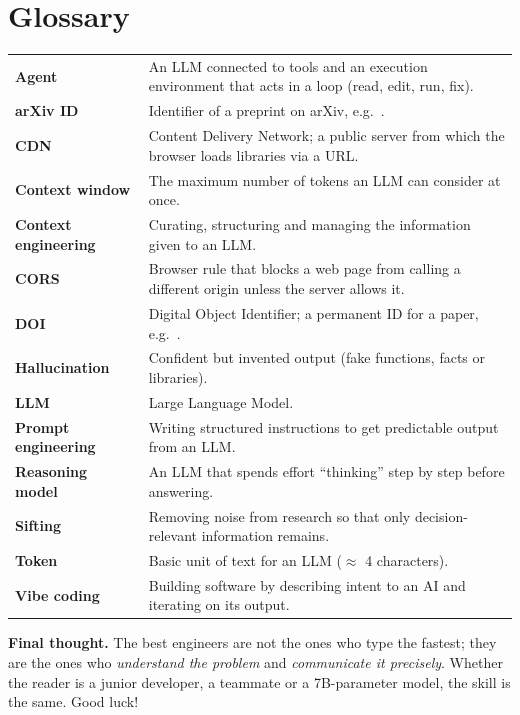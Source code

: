 \documentclass[11pt,a4paper]{article}
\newcommand{\fn}[1]{\texttt{\detokenize{#1}}}
\begin{document}
\section{Glossary}
\begin{tabularx}{\textwidth}{@{}>{\bfseries}p{3.3cm}L@{}}
\toprule
Agent & An LLM connected to tools and an execution environment that acts in a loop (read, edit, run, fix).\\
arXiv ID & Identifier of a preprint on arXiv, e.g.\ \fn{2101.00001}.\\
CDN & Content Delivery Network; a public server from which the browser loads libraries via a URL.\\
Context window & The maximum number of tokens an LLM can consider at once.\\
Context engineering & Curating, structuring and managing the information given to an LLM.\\
CORS & Browser rule that blocks a web page from calling a different origin unless the server allows it.\\
DOI & Digital Object Identifier; a permanent ID for a paper, e.g.\ \fn{10.1109/CVPR.2016.90}.\\
Hallucination & Confident but invented output (fake functions, facts or libraries).\\
LLM & Large Language Model.\\
Prompt engineering & Writing structured instructions to get predictable output from an LLM.\\
Reasoning model & An LLM that spends effort ``thinking'' step by step before answering.\\
Sifting & Removing noise from research so that only decision-relevant information remains.\\
Token & Basic unit of text for an LLM ($\approx$ 4 characters).\\
Vibe coding & Building software by describing intent to an AI and iterating on its output.\\
\bottomrule
\end{tabularx}

\vspace{1em}
\begin{tcolorbox}[colback=tipbg,colframe=accent,boxrule=0.6pt,arc=2pt]
\textbf{Final thought.} The best engineers are not the ones who type the fastest; they are the ones who \emph{understand the problem} and \emph{communicate it precisely}. Whether the reader is a junior developer, a teammate or a 7B-parameter model, the skill is the same. Good luck!
\end{tcolorbox}
\end{document}

